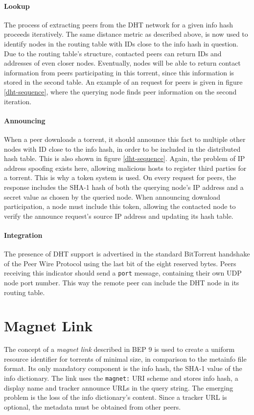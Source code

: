 \documentclass[10pt, a4paper, twoside, headsepline]{scrbook}
\renewcommand{\_}{\origunderscore\allowbreak}
\begin{document}
\paragraph{Lookup}
The process of extracting peers from the DHT network for a given info hash proceeds iteratively. The same distance metric as described above, is now used to identify nodes in the routing table with IDs close to the info hash in question. Due to the routing table's structure, contacted peers can return IDs and addresses of even closer nodes. Eventually, nodes will be able to return contact information from peers participating in this torrent, since this information is stored in the second table. An example of an request for peers is given in figure \ref{dht-sequence}, where the querying node finds peer information on the second iteration.

\paragraph{Announcing}
When a peer downloads a torrent, it should announce this fact to multiple other nodes with ID close to the info hash, in order to be included in the distributed hash table. This is also shown in figure \ref{dht-sequence}. Again, the problem of IP address spoofing exists here, allowing malicious hosts to register third parties for a torrent. This is why a token system is used. On every request for peers, the response includes the SHA-1 hash of both the querying node's IP address and a secret value as chosen by the queried node. When announcing download participation, a node must include this token, allowing the contacted node to verify the announce request's source IP address and updating its hash table.

\paragraph{Integration}
The presence of DHT support is advertised in the standard BitTorrent handshake of the Peer Wire Protocol using the last bit of the eight reserved bytes. Peers receiving this indicator should send a \texttt{port} message, containing their own UDP node port number. This way the remote peer can include the DHT node in its routing table.

\section{Magnet Link}
\label{magnet}
The concept of a \emph{magnet link} described in BEP 9 \cite{bep9} is used to create a uniform resource identifier for torrents of minimal size, in comparison to the metainfo file format. Its only mandatory component is the info hash, the SHA-1 value of the info dictionary. The link uses the \texttt{magnet:} URI scheme and stores info hash, a display name and tracker announce URLs in the query string. The emerging problem is the loss of the info dictionary's content. Since a tracker URL is optional, the metadata must be obtained from other peers.
\end{document}

